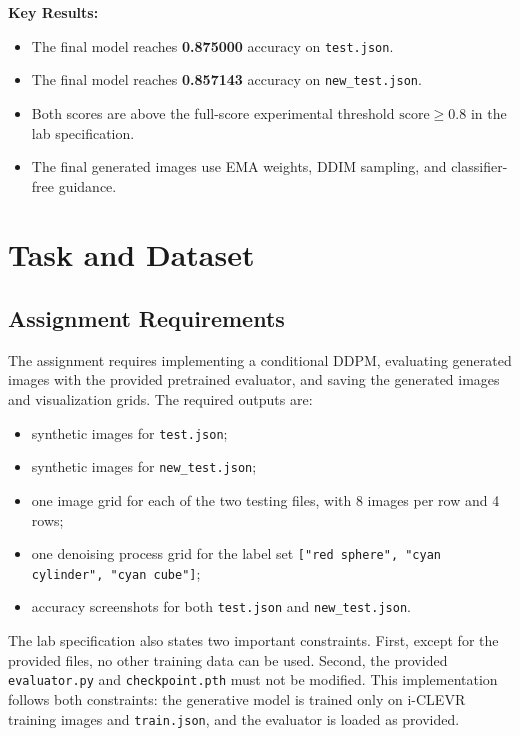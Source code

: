 \documentclass[12pt,a4paper]{article}
\begin{document}
\noindent\textbf{Key Results:}\par\smallskip
\begin{itemize}
    \item The final model reaches
          \textcolor{red!70!black}{\textbf{0.875000}} accuracy on
          \texttt{test.json}.
    \item The final model reaches
          \textcolor{red!70!black}{\textbf{0.857143}} accuracy on
          \texttt{new\_test.json}.
    \item Both scores are above the full-score experimental threshold
          $\mathrm{score} \geq 0.8$ in the lab specification.
    \item The final generated images use EMA weights, DDIM sampling, and
          classifier-free guidance.
\end{itemize}

\newpage

\section{Task and Dataset}

\subsection{Assignment Requirements}

The assignment requires implementing a conditional DDPM, evaluating generated
images with the provided pretrained evaluator, and saving the generated images
and visualization grids.  The required outputs are:
\begin{itemize}
    \item synthetic images for \texttt{test.json};
    \item synthetic images for \texttt{new\_test.json};
    \item one image grid for each of the two testing files, with 8 images per
          row and 4 rows;
    \item one denoising process grid for the label set
          \texttt{["red sphere", "cyan cylinder", "cyan cube"]};
    \item accuracy screenshots for both \texttt{test.json} and
          \texttt{new\_test.json}.
\end{itemize}

The lab specification also states two important constraints.  First, except for
the provided files, no other training data can be used.  Second, the provided
\texttt{evaluator.py} and \texttt{checkpoint.pth} must not be modified.  This
implementation follows both constraints: the generative model is trained only
on i-CLEVR training images and \texttt{train.json}, and the evaluator is loaded
as provided.
\end{document}
